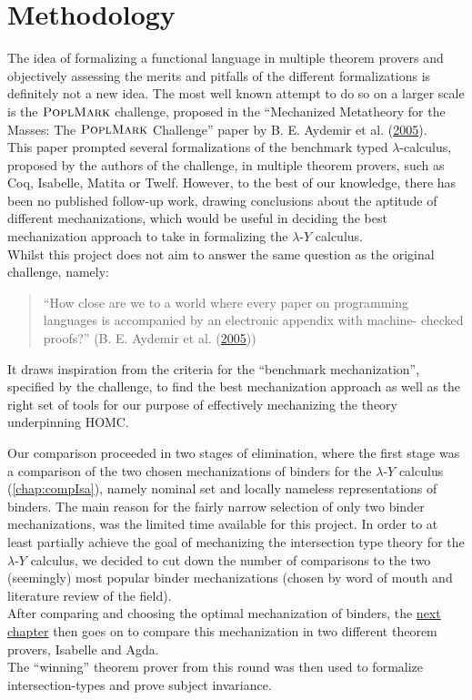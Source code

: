 \documentclass[a4paper, 12pt, twoside]{style/ociamthesis}
\theoremstyle{plain}
\theoremstyle{definition}
\theoremstyle{remark}
\newcommand{\lamy}{\lambda\text{-}Y}
\newcommand{\poplm}{\textsc{PoplMark}}
\begin{document}
\chapter{Methodology}\label{methodology}

The idea of formalizing a functional language in multiple theorem
provers and objectively assessing the merits and pitfalls of the
different formalizations is definitely not a new idea. The most well
known attempt to do so on a larger scale is the \(\poplm\) challenge,
proposed in the ``Mechanized Metatheory for the Masses: The \(\poplm\)
Challenge'' paper by B. E. Aydemir et al.
(\protect\hyperlink{ref-aydemir05}{2005}).\\
This paper prompted several formalizations of the benchmark typed
\(\lambda\)-calculus, proposed by the authors of the challenge, in
multiple theorem provers, such as Coq, Isabelle, Matita or Twelf.
However, to the best of our knowledge, there has been no published
follow-up work, drawing conclusions about the aptitude of different
mechanizations, which would be useful in deciding the best mechanization
approach to take in formalizing the \(\lamy\) calculus.\\
Whilst this project does not aim to answer the same question as the
original challenge, namely:

\begin{quote}
``How close are we to a world where every paper on programming languages
is accompanied by an electronic appendix with machine- checked proofs?''
(B. E. Aydemir et al. (\protect\hyperlink{ref-aydemir05}{2005}))
\end{quote}

It draws inspiration from the criteria for the ``benchmark
mechanization'', specified by the challenge, to find the best
mechanization approach as well as the right set of tools for our purpose
of effectively mechanizing the theory underpinning HOMC.

Our comparison proceeded in two stages of elimination, where the first
stage was a comparison of the two chosen mechanizations of binders for
the \(\lamy\) calculus (\cref{chap:compIsa}), namely nominal set and
locally nameless representations of binders. The main reason for the
fairly narrow selection of only two binder mechanizations, was the
limited time available for this project. In order to at least partially
achieve the goal of mechanizing the intersection type theory for the
\(\lamy\) calculus, we decided to cut down the number of comparisons to
the two (seemingly) most popular binder mechanizations (chosen by word
of mouth and literature review of the field).\\
After comparing and choosing the optimal mechanization of binders, the
\hyperref[chap:compAgda]{next chapter} then goes on to compare this
mechanization in two different theorem provers, Isabelle and Agda.\\
The ``winning'' theorem prover from this round was then used to
formalize intersection-types and prove subject invariance.
\end{document}
